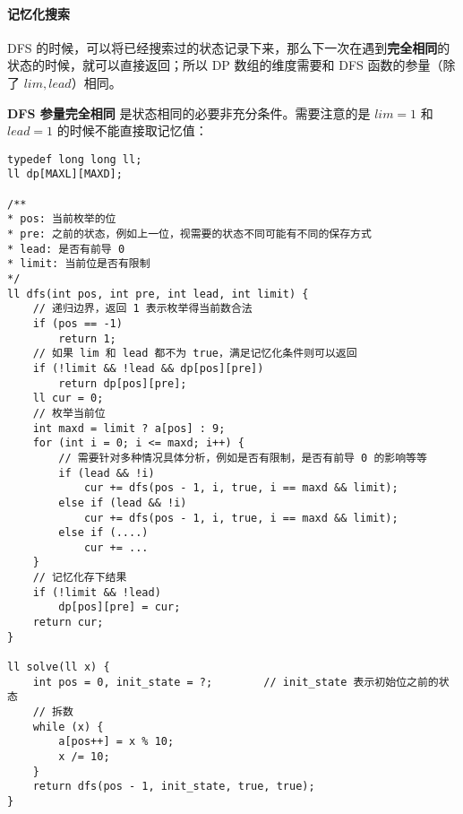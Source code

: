 \paragraph{记忆化搜索}DFS 的时候，可以将已经搜索过的状态记录下来，那么下一次在遇到\textbf{完全相同}的状态的时候，就可以直接返回；所以 DP 数组的维度需要和 DFS 函数的参量（除了 $lim, lead$）相同。

\par \textbf{DFS 参量完全相同} 是状态相同的必要非充分条件。需要注意的是 $lim = 1$ 和 $lead = 1$ 的时候不能直接取记忆值：

\begin{verbatim}
typedef long long ll;
ll dp[MAXL][MAXD];

/**
* pos: 当前枚举的位
* pre: 之前的状态，例如上一位，视需要的状态不同可能有不同的保存方式
* lead: 是否有前导 0
* limit: 当前位是否有限制
*/
ll dfs(int pos, int pre, int lead, int limit) {
    // 递归边界，返回 1 表示枚举得当前数合法
    if (pos == -1)
        return 1;
    // 如果 lim 和 lead 都不为 true，满足记忆化条件则可以返回
    if (!limit && !lead && dp[pos][pre])
        return dp[pos][pre];
    ll cur = 0;
    // 枚举当前位
    int maxd = limit ? a[pos] : 9;
    for (int i = 0; i <= maxd; i++) {
        // 需要针对多种情况具体分析，例如是否有限制，是否有前导 0 的影响等等
        if (lead && !i)
            cur += dfs(pos - 1, i, true, i == maxd && limit);
        else if (lead && !i)
            cur += dfs(pos - 1, i, true, i == maxd && limit);
        else if (....)
            cur += ...
    }
    // 记忆化存下结果
    if (!limit && !lead)
        dp[pos][pre] = cur;
    return cur;
}

ll solve(ll x) {
    int pos = 0, init_state = ?;        // init_state 表示初始位之前的状态
    // 拆数
    while (x) {
        a[pos++] = x % 10;
        x /= 10;
    }
    return dfs(pos - 1, init_state, true, true);
}
\end{verbatim}

